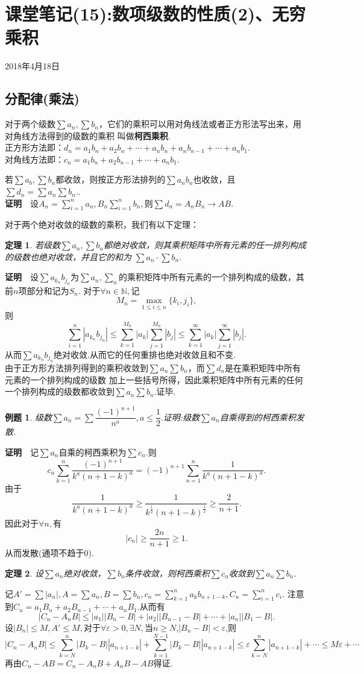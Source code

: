 \documentclass[UTF8]{article}
\newcommand{\zm}{\textbf{证明}$\quad$}
\newtheorem{thm}{\hspace{2em}定理}[section]
\newtheorem{exa}{\hspace{2em}例题}[section]
\begin{document}
\section{课堂笔记(15):数项级数的性质(2)、无穷乘积}
\begin{center}
  2018年4月18日
\end{center}
\subsection{分配律(乘法)}
对于两个级数$\sum a_n,\sum b_n$，它们的乘积可以用对角线法或者正方形法写出来，用对角线方法得到的级数的乘积
叫做\textbf{柯西乘积}.\\
正方形方法即：$d_n=a_1b_n+a_2b_n+\cdots+a_nb_n+a_nb_{n-1}+\cdots+a_nb_1$.\\
对角线方法即：$c_n=a_1b_n+a_2b_{n-1}+\cdots+a_nb_1.$

若$\sum a_b,\sum b_n$都收敛，则按正方形法排列的$\sum a_nb_n$也收敛，且$\sum d_n=\sum a_n\sum b_n.$.\\
\zm 设$A_n=\sum_{i=1}^na_n,B_n\sum_{i=1}^nb_n,$则$\sum d_n=A_nB_n\to AB.$

对于两个绝对收敛的级数的乘积，我们有以下定理：
\begin{thm}
  若级数$\sum a_n,\sum b_n$都绝对收敛，则其乘积矩阵中所有元素的任一排列构成的级数也绝对收敛，并且它的和为
  $\sum a_n\cdot\sum b_n.$
\end{thm}
\zm 设$\sum a_{k_n}b_{j_n}$为$\sum a_n,\sum _n$的乘积矩阵中所有元素的一个排列构成的级数，其前$n$项部分和记为$S_n.$
对于$\forall n\in\mathbb{N},$记
$$M_n=\max_{1\le i\le n}\{k_i,j_i\},$$
则$$\sum_{i=1}^n|a_{k_n}b_{j_n}|\le\sum_{k=1}^{M_n}|a_k|\sum_{j=1}^{M_n}|b_j|\le
\sum_{k=1}^\infty|a_k|\sum_{j=1}^\infty|b_j|.$$
从而$\sum a_{k_n}b_{j_n}$绝对收敛.从而它的任何重排也绝对收敛且和不变.\\
由于正方形方法排列得到的乘积收敛到$\sum a_n\sum b_n$，而$\sum d_n$是在乘积矩阵中所有元素的一个排列构成的级数
加上一些括号所得，因此乘积矩阵中所有元素的任何一个排列构成的级数都收敛到$\sum a_n\sum b_n$.证毕.
\begin{exa}
  级数$\sum a_n=\sum\dfrac{(-1)^{n+1}}{n^a},a\le\dfrac{1}{2}.$证明:级数$\sum a_n$自乘得到的柯西乘积发散.
\end{exa}
\zm 记$\sum a_n$自乘的柯西乘积为$\sum c_n.$则
$$c_n\sum_{k=1}^n\frac{(-1)^{n+1}}{k^a(n+1-k)^a}=(-1)^{n+1}\sum_{n=1}^n\frac{1}{k^a(n+1-k)^a}.$$
由于
$$\frac{1}{k^a(n+1-k)^a}\ge\frac{1}{k^\frac{1}{2}(n+1-k)^\frac{1}{2}}\ge\frac{2}{n+1}.$$
因此对于$\forall n,$有
$$|c_n|\ge \frac{2n}{n+1}\ge 1.$$
从而发散(通项不趋于0).
\begin{thm}
  设$\sum a_n$绝对收敛，$\sum b_n$条件收敛，则柯西乘积$\sum c_n$收敛到$\sum a_n\sum b_n$.
\end{thm}
  记$A'=\sum |a_n|,A=\sum a_n,B=\sum b_n,c_n=\sum_{k=1}^na_kb_{n+1-k},C_n=\sum_{i=1}^nc_i.$
  注意到$C_n=a_1B_n+a_2B_{n-1}+\cdots+a_nB_1.$从而有
  $$|C_n-A_nB|\le|a_1||B_n-B|+|a_2||B_{n-1}-B|+\cdots+|a_n||B_1-B|.$$
  设$|B_n|\le M,A'\le M,$对于$\forall \varepsilon>0,\exists N,$当$n\ge N$,$|B_n-B|<\varepsilon$,则
  $$|C_n-A_nB|\le\sum_{k=N}^n|B_k-B||a_{n+1-k}|+\sum_{k=1}^{N-1}|B_k-B||a_{n+1-k}|
  \le\varepsilon\sum_{k=N}^n|a_{n+1-k}|+\cdots\le M\varepsilon+\cdots$$
  再由$C_n-AB=C_n-A_nB+A_nB-AB$得证.
\end{document}
